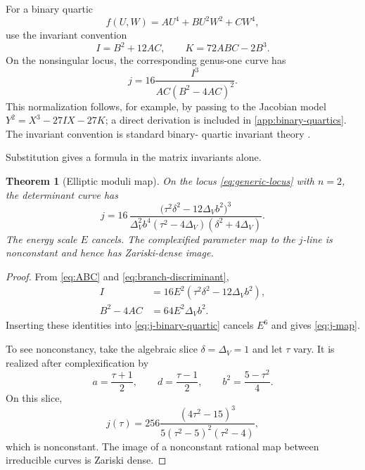 \documentclass[11pt,reqno]{amsart}
\newtheorem{theorem}{Theorem}[section]
\theoremstyle{remark}
\begin{document}
For a binary quartic
\begin{equation}\label{eq:binary-quartic}
 f(U,W)=A U^4+B U^2W^2+C W^4,
\end{equation}
use the invariant convention
\begin{equation}\label{eq:IJ}
 I=B^2+12AC,\qquad
 K=72ABC-2B^3.
\end{equation}
On the nonsingular locus, the corresponding genus-one curve has
\begin{equation}\label{eq:j-binary-quartic}
 j=16\frac{I^3}{AC(B^2-4AC)^2}.
\end{equation}
This normalization follows, for example, by passing to the Jacobian model
$Y^2=X^3-27IX-27K$; a direct derivation is included in
\cref{app:binary-quartics}.  The invariant convention is standard binary-
quartic invariant theory \cite{Fisher2008}.

Substitution gives a formula in the matrix invariants alone.

\begin{theorem}[Elliptic moduli map]\label{thm:j-map}
On the locus \eqref{eq:generic-locus} with $n=2$, the determinant curve has
\begin{equation}\label{eq:j-map}
 j=
 16\,
 \frac{\bigl(\tau^2\delta^2-12\Delta_Vb^2\bigr)^3}
 {\Delta_V^2b^4
  (\tau^2-4\Delta_V)(\delta^2+4\Delta_V)}.
\end{equation}
The energy scale $E$ cancels.  The complexified parameter map to the
$j$-line is nonconstant and hence has Zariski-dense image.
\end{theorem}

\begin{proof}
From \eqref{eq:ABC} and \eqref{eq:branch-discriminant},
\begin{align}
 I&=16E^2(\tau^2\delta^2-12\Delta_Vb^2),\label{eq:I-factor}\\
 B^2-4AC&=64E^2\Delta_Vb^2.\label{eq:D-factor}
\end{align}
Inserting these identities into \eqref{eq:j-binary-quartic} cancels $E^6$
and gives \eqref{eq:j-map}.

To see nonconstancy, take the algebraic slice
$\delta=\Delta_V=1$ and let $\tau$ vary.  It is realized after
complexification by
\[
 a=\frac{\tau+1}{2},\qquad
 d=\frac{\tau-1}{2},\qquad
 b^2=\frac{5-\tau^2}{4}.
\]
On this slice,
\begin{equation}\label{eq:j-slice}
 j(\tau)=
 256\frac{(4\tau^2-15)^3}
 {5(\tau^2-5)^2(\tau^2-4)},
\end{equation}
which is nonconstant.  The image of a nonconstant rational map between
irreducible curves is Zariski dense.
\end{proof}
\end{document}
